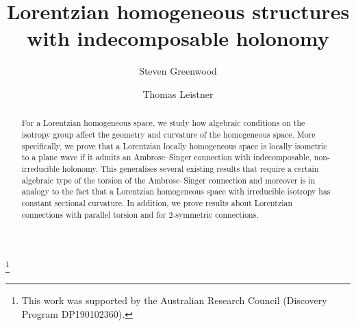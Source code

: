 \documentclass[11pt,a4paper]{amsart}
\newcommand{\+}{\oplus}
\newcommand{\1}{\mathbf{1}}
\newcommand{\<}{\langle}
\renewcommand{\>}{\rangle}
\theoremstyle{definition}
\theoremstyle{plain}
\numberwithin{equation}{section}
\begin{document}
\title[Lorentzian  homogeneous structures with indecomposable holonomy]{Lorentzian  homogeneous structures\\[1mm]with indecomposable holonomy}


\thanks{This work was supported by 
 the Australian Research
Council (Discovery Program DP190102360).}
 \author[Steven Greenwood]{Steven Greenwood}

\author[Thomas Leistner]{Thomas Leistner}\address{School of Computer and Mathematical Sciences, University of Adelaide, SA~5005, Australia}



\begin{abstract}
For a Lorentzian homogeneous space, we study how algebraic conditions on the isotropy group affect the geometry and curvature of the homogeneous space. More specifically, we prove that a Lorentzian locally homogeneous space is locally isometric to a plane wave if it admits an Ambrose--Singer connection with indecomposable, non-irreducible holonomy. This generalises several existing results that require a certain algebraic type of the torsion of the Ambrose--Singer connection and moreover is in analogy to the fact that a Lorentzian homogeneous space with irreducible isotropy has constant sectional curvature. In addition, we prove results about Lorentzian connections with parallel torsion and for $2$-symmetric connections.
 \end{abstract}
\end{document}
